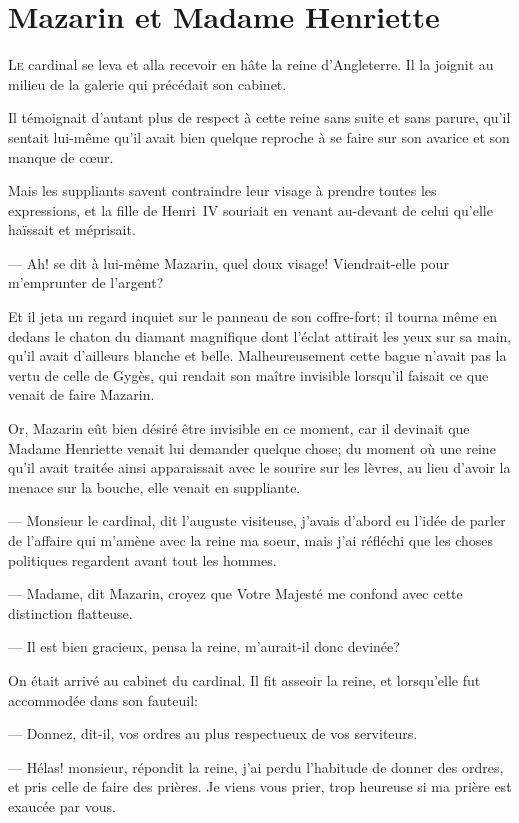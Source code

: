 \chapter{Mazarin et Madame Henriette}

\lettrine{L}{e} cardinal se leva et alla recevoir en hâte la reine d'Angleterre. Il la joignit au milieu de la galerie qui précédait son cabinet.

\zz
Il témoignait d'autant plus de respect à cette reine sans suite et sans parure, qu'il sentait lui-même qu'il avait bien quelque reproche à se faire sur son avarice et son manque de cœur.

Mais les suppliants savent contraindre leur visage à prendre toutes les expressions, et la fille de Henri~IV souriait en venant au-devant de celui qu'elle haïssait et méprisait.

— Ah! se dit à lui-même Mazarin, quel doux visage! Viendrait-elle pour m'emprunter de l'argent?

Et il jeta un regard inquiet sur le panneau de son coffre-fort; il tourna même en dedans le chaton du diamant magnifique dont l'éclat attirait les yeux sur sa main, qu'il avait d'ailleurs blanche et belle. Malheureusement cette bague n'avait pas la vertu de celle de Gygès, qui rendait son maître invisible lorsqu'il faisait ce que venait de faire Mazarin.

Or, Mazarin eût bien désiré être invisible en ce moment, car il devinait que Madame Henriette venait lui demander quelque chose; du moment où une reine qu'il avait traitée ainsi apparaissait avec le sourire sur les lèvres, au lieu d'avoir la menace sur la bouche, elle venait en suppliante.

— Monsieur le cardinal, dit l'auguste visiteuse, j'avais d'abord eu l'idée de parler de l'affaire qui m'amène avec la reine ma soeur, mais j'ai réfléchi que les choses politiques regardent avant tout les hommes.

— Madame, dit Mazarin, croyez que Votre Majesté me confond avec cette distinction flatteuse.

— Il est bien gracieux, pensa la reine, m'aurait-il donc devinée?

On était arrivé au cabinet du cardinal. Il fit asseoir la reine, et lorsqu'elle fut accommodée dans son fauteuil:

— Donnez, dit-il, vos ordres au plus respectueux de vos serviteurs.

— Hélas! monsieur, répondit la reine, j'ai perdu l'habitude de donner des ordres, et pris celle de faire des prières. Je viens vous prier, trop heureuse si ma prière est exaucée par vous.

